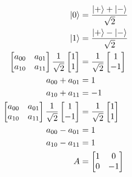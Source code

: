 \documentclass{article}
\begin{document}
\begin{align*}
  \ket{0}                                          & = \frac{\ket{+} + \ket{-}}{\sqrt{2}} \\
  \ket{1}                                          & = \frac{\ket{+} - \ket{-}}{\sqrt{2}} \\
  \begin{bmatrix}
    a_{0 0} & a_{0 1} \\
    a_{1 0} & a_{1 1}
  \end{bmatrix} \frac{1}{\sqrt{2}} \begin{bmatrix}
                                     1 \\
                                     1
                                   \end{bmatrix} & = \frac{1}{\sqrt{2}} \begin{bmatrix}
                                                                          1 \\
                                                                          -1
                                                                        \end{bmatrix}    \\
  a_{0 0} + a_{0 1}                                & = 1                                  \\
  a_{1 0} + a_{1 1}                                & = -1                                 \\
  \begin{bmatrix}
    a_{0 0} & a_{0 1} \\
    a_{1 0} & a_{1 1}
  \end{bmatrix} \frac{1}{\sqrt{2}} \begin{bmatrix}
                                     1 \\
                                     -1
                                   \end{bmatrix} & = \frac{1}{\sqrt{2}} \begin{bmatrix}
                                                                          1 \\
                                                                          1
                                                                        \end{bmatrix}    \\
  a_{0 0} - a_{0 1}                                & = 1                                  \\
  a_{1 0} - a_{1 1}                                & = 1                                  \\
  A                                                & = \begin{bmatrix}
                                                         1 & 0  \\
                                                         0 & -1
                                                       \end{bmatrix}
\end{align*}
\end{document}
